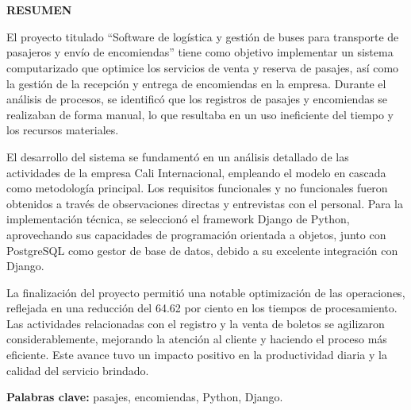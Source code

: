 \chapter*{} %

\begin{center}
	{\bfseries\fontsize{13pt}{16pt}\selectfont RESUMEN}
\end{center}

\vspace{1em}

El proyecto titulado “Software de logística y gestión de buses para transporte de pasajeros y envío de encomiendas” tiene como objetivo implementar un sistema computarizado que optimice los servicios de venta y reserva de pasajes, así como la gestión de la recepción y entrega de encomiendas en la empresa. Durante el análisis de procesos, se identificó que los registros de pasajes y encomiendas se realizaban de forma manual, lo que resultaba en un uso ineficiente del tiempo y los recursos materiales.

El desarrollo del sistema se fundamentó en un análisis detallado de las actividades de la empresa Cali Internacional, empleando el modelo en cascada como metodología principal. Los requisitos funcionales y no funcionales fueron obtenidos a través de observaciones directas y entrevistas con el personal. Para la implementación técnica, se seleccionó el framework Django de Python, aprovechando sus capacidades de programación orientada a objetos, junto con PostgreSQL como gestor de base de datos, debido a su excelente integración con Django.

La finalización del proyecto permitió una notable optimización de las operaciones, reflejada en una reducción del 64.62 por ciento en los tiempos de procesamiento. Las actividades relacionadas con el registro y la venta de boletos se agilizaron considerablemente, mejorando la atención al cliente y haciendo el proceso más eficiente. Este avance tuvo un impacto positivo en la productividad diaria y la calidad del servicio brindado.

\vspace{1em}
\noindent\textbf{Palabras clave:} pasajes, encomiendas, Python, Django.
